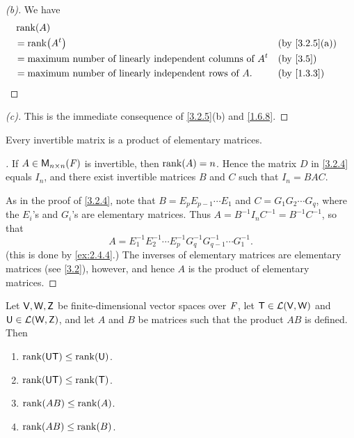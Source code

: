 \begin{proof}[(b)]
  We have
  \begin{align*}
     & \rk{A}                                                                                              \\
     & = \rk{\tp{A}}                                                      &  & \text{(by \cref{3.2.5}(a))} \\
     & = \text{maximum number of linearly independent columns of } \tp{A} &  & \text{(by \cref{3.5})}      \\
     & = \text{maximum number of linearly independent rows of } A.        &  & \text{(by \cref{1.3.3})}
  \end{align*}
\end{proof}

\begin{proof}[(c)]
  This is the immediate consequence of \cref{3.2.5}(b) and \cref{1.6.8}.
\end{proof}

\begin{cor}\label{3.2.6}
  Every invertible matrix is a product of elementary matrices.
\end{cor}

\begin{proof}[]
  If \(A \in \mathsf{M}_{{n} \times n}({\mathit{F}})\) is invertible, then \(\rk{A} = n\).
  Hence the matrix \(D\) in \cref{3.2.4} equals \(I_n\), and there exist invertible matrices \(B\) and \(C\) such that \(I_n = BAC\).

  As in the proof of \cref{3.2.4}, note that \(B = E_p E_{p - 1} \cdots E_1\) and \(C = G_1 G_2 \cdots G_q\), where the \(E_i\)'s and \(G_i\)'s are elementary matrices.
  Thus \(A = B^{-1} I_n C^{-1} = B^{-1} C^{-1}\), so that
  \[
    A = E_1^{-1} E_2^{-1} \cdots E_p^{-1} G_q^{-1} G_{q - 1}^{-1} \cdots G_1^{-1}.
  \]
  (this is done by \cref{ex:2.4.4}.)
  The inverses of elementary matrices are elementary matrices (see \cref{3.2}), however, and hence \(A\) is the product of elementary matrices.
\end{proof}

\begin{thm}\label{3.7}
  Let \(\mathsf{V}, \mathsf{W}, \mathsf{Z}\) be finite-dimensional vector spaces over \(\mathit{F}\), let \(\mathsf{T} \in \mathcal{L}(\mathsf{V}, \mathsf{W})\) and \(\mathsf{U} \in \mathcal{L}(\mathsf{W}, \mathsf{Z})\), and let \(A\) and \(B\) be matrices such that the product \(AB\) is defined.
  Then
  \begin{enumerate}
    \item \(\rk{\U \T} \leq \rk{\U}\).
    \item \(\rk{\U \T} \leq \rk{\T}\).
    \item \(\rk{AB} \leq \rk{A}\).
    \item \(\rk{AB} \leq \rk{B}\).
  \end{enumerate}
\end{thm}

